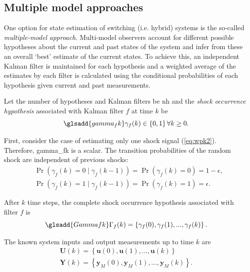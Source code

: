 \subsection{Multiple model approaches}

One option for state estimation of switching (i.e. hybrid) systems is the so-called \textit{multiple-model approach}. Multi-model observers account for different possible hypotheses about the current and past states of the system and infer from these an overall `best' estimate of the current states. To achieve this, an independent Kalman filter is maintained for each hypothesis and a weighted average of the estimates by each filter is calculated using the conditional probabilities of each hypothesis given current and past measurements.

Let the number of hypotheses and Kalman filters be \gls{nh} and the \textit{shock occurrence hypothesis} associated with Kalman filter $f$ at time $k$ be
\begin{equation} \label{eq:gammak} \glsadd{gamma_fk}
	\gamma_{f}(k) \in \left\{0, 1 \right\} \forall{k \ge 0}.
\end{equation}

First, consider the case of estimating only one shock signal (\ref{eq:wpk2}). Therefore, \gls{gamma_fk} is a scalar. The transition probabilities of the random shock are independent of previous shocks:
\begin{equation} \label{eq:Pr_gammak_given_gammakm1}
	\begin{aligned}
		& \Pr\left(\gamma_{f}(k)=0 \mid \gamma_{f}(k-1)\right) = \Pr\left(\gamma_{f}(k)=0\right) = 1-\epsilon, \\
		& \Pr\left(\gamma_{f}(k)=1 \mid \gamma_{f}(k-1)\right) = \Pr\left(\gamma_{f}(k)=1\right) = \epsilon.
	\end{aligned}
\end{equation}

After $k$ time steps, the complete shock occurrence hypothesis associated with filter $f$ is
\begin{equation} \label{eq:Gammak} \glsadd{Gammafk}
	\Gamma_f(k) = \left\{ \gamma_f(0), \gamma_f(1), ..., \gamma_f(k) \right\}.
\end{equation}

The known system inputs and output measurements up to time $k$ are
\begin{equation} \label{eq:Uk_Yk}
	\begin{aligned}
		\mathbf{U}(k) = \left\{ \mathbf{u}(0), \mathbf{u}(1), ..., \mathbf{u}(k) \right\} \\
		\mathbf{Y}(k) = \left\{ \mathbf{y}_M(0), \mathbf{y}_M(1), ..., \mathbf{y}_M(k) \right\}.
	\end{aligned}
\end{equation}

